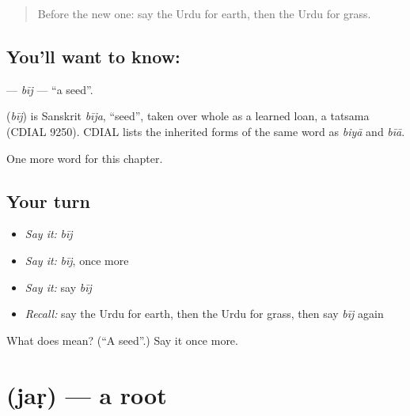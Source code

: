 \label{lesson:UR-C123-bij}



\begin{quote}
Before the new one: say the Urdu for earth, then the Urdu for grass.
\end{quote}

\subsection*{You'll want to know: }
\textbf{} — \emph{bīj} — \textquotedblleft{}a seed\textquotedblright{}.

\begin{cousinweb}
\textbf{} (\emph{bīj}) is Sanskrit \emph{bīja}, \textquotedblleft{}seed\textquotedblright{}, taken over whole as a learned loan, a tatsama (CDIAL 9250). CDIAL lists the inherited forms of the same word as \emph{biyā} and \emph{bīā}.
\end{cousinweb}

\begin{grammarlens}[title={What you've built}]
One more word for this chapter.
\end{grammarlens}

\subsection*{Your turn}
\begin{itemize}
\raggedright
  \item \emph{Say it:} \emph{bīj}
  \item \emph{Say it:} \emph{bīj}, once more
  \item \emph{Say it:} say \emph{bīj}
  \item \emph{Recall:} say the Urdu for earth, then the Urdu for grass, then say \emph{bīj} again
\end{itemize}

\begin{tcolorbox}[breakable,colback=teal!4,colframe=teal!35!black,title={Before you move on}]
What does  mean? (\textquotedblleft{}A seed\textquotedblright{}.) Say it once more.
\end{tcolorbox}
\section[\texorpdfstring{\ur{جڑ} (jaṛ)}{جڑ (jaṛ)}]{ (jaṛ) — a root}

\label{lesson:UR-C123-jar}



